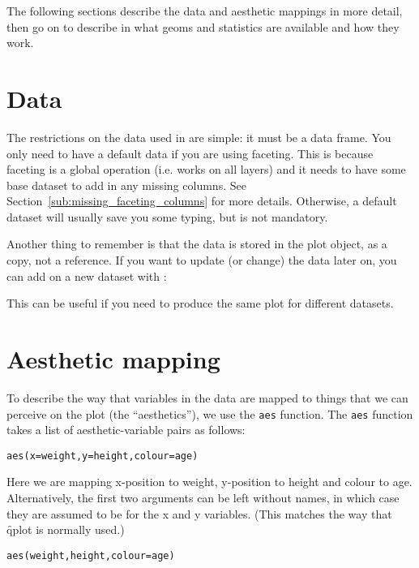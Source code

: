 The following sections describe the data and aesthetic mappings in more detail, then go on to describe in what geoms and statistics are available and how they work.

\section{Data}
\label{sec:data}

The restrictions on the data used in \ggplot are simple: it must be a data frame.  You only need to have a default data if you are using faceting.  This is because faceting is a global operation (i.e. works on all layers) and it needs to have some base dataset to add in any missing columns.  See Section~\ref{sub:missing_faceting_columns} for more details.  Otherwise, a default dataset will usually save you some typing, but is not mandatory.

Another thing to remember is that the data is stored in the plot object, as a copy, not a reference.  If you want to update (or change) the data later on, you can add on a new dataset with \code{\%+\%}:

% 

\noindent This can be useful if you need to produce the same plot for different datasets.

\section{Aesthetic mapping}
\label{sec:aes}

To describe the way that variables in the data are mapped to things that we can perceive on the plot (the ``aesthetics''), we use the {\tt aes} function.  The {\tt aes} function takes a list of aesthetic-variable pairs as follows:

\begin{alltt}
aes(x = weight, y = height, colour = age)
\end{alltt}

Here we are mapping x-position to weight, y-position to height and colour to age.  Alternatively, the first two arguments can be left without names, in which case they are assumed to be for the x and y variables.  (This matches the way that \f{qplot} is normally used.)

\begin{alltt}
aes(weight, height, colour = age)
\end{alltt}


